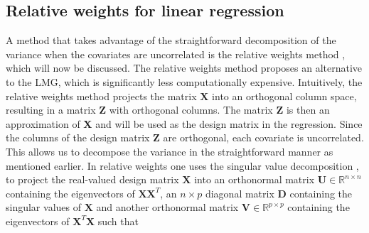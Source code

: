 \subsection{Relative weights for linear regression}
\label{sec:relativeweights}
A method that takes advantage of the straightforward decomposition of the variance when the covariates are uncorrelated is the relative weights method \citep{johnson_relative_weights}, which will now be discussed.
\newline
\newline
The relative weights method proposes an alternative to the LMG, which is significantly less computationally expensive. 
Intuitively, the relative weights method projects the matrix $\mathbf{X}$ into an orthogonal column space, resulting in a matrix $\mathbf{Z}$ with orthogonal columns.
The matrix $\mathbf{Z}$ is then an approximation of $\mathbf{X}$ and will be used as the design matrix in the regression. Since the columns of the design matrix $\mathbf{Z}$ are orthogonal, each covariate is uncorrelated. 
This allows us to decompose the variance in the straightforward manner as mentioned earlier.
\newline
\newline
In relative weights one uses the singular value decomposition \citep{relative_weights_nimon_oswald}, to project the real-valued design matrix $\mathbf{X}$ into an orthonormal matrix $\mathbf{U} \in \mathbb{R}^{n \times n}$ containing the eigenvectors of $\mathbf{X}\mathbf{X}^T$, an $n\times p$ diagonal matrix $\mathbf{D}$ containing the singular values of $\mathbf{X}$ and another orthonormal matrix $\mathbf{V} \in \mathbb{R}^{p \times p}$ containing the eigenvectors of $\mathbf{X}^T\mathbf{X}$ such that
